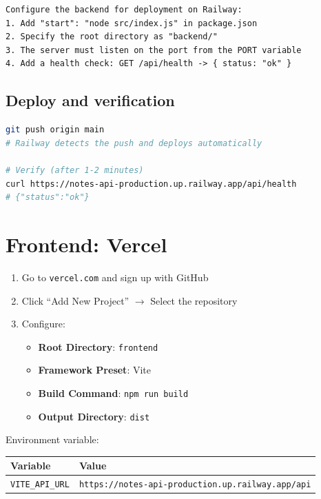 \begin{praticabox}[title={Practice --- Configure the build}]
\begin{lstlisting}[language={}]
Configure the backend for deployment on Railway:
1. Add "start": "node src/index.js" in package.json
2. Specify the root directory as "backend/"
3. The server must listen on the port from the PORT variable
4. Add a health check: GET /api/health -> { status: "ok" }
\end{lstlisting}
\end{praticabox}

\subsection{Deploy and verification}

\begin{lstlisting}[language=bash]
git push origin main
# Railway detects the push and deploys automatically

# Verify (after 1-2 minutes)
curl https://notes-api-production.up.railway.app/api/health
# {"status":"ok"}
\end{lstlisting}

\section{Frontend: Vercel}

\begin{praticabox}[title={Practice --- Vercel setup}]
\begin{enumerate}
  \item Go to \texttt{vercel.com} and sign up with GitHub
  \item Click ``Add New Project'' $\rightarrow$ Select the repository
  \item Configure:
  \begin{itemize}
    \item \textbf{Root Directory}: \texttt{frontend}
    \item \textbf{Framework Preset}: Vite
    \item \textbf{Build Command}: \texttt{npm run build}
    \item \textbf{Output Directory}: \texttt{dist}
  \end{itemize}
\end{enumerate}
\end{praticabox}

Environment variable:
\begin{center}
\begin{tabularx}{\textwidth}{l X}
\toprule
\textbf{Variable} & \textbf{Value} \\
\midrule
\texttt{VITE\_API\_URL} & \texttt{https://notes-api-production.up.railway.app/api} \\
\bottomrule
\end{tabularx}
\end{center}

